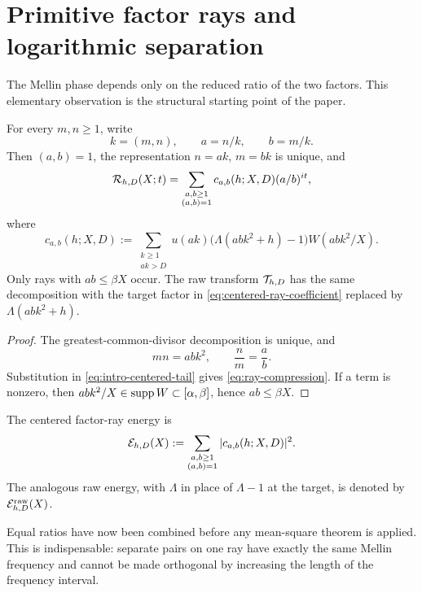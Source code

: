 \section{Primitive factor rays and logarithmic separation}
\label{sec:ray-geometry}

The Mellin phase depends only on the reduced ratio of the two factors.
This elementary observation is the structural starting point of the paper.

\begin{proposition}
\label{prop:ray-compression}
For every $m,n\geq1$, write
\[
 k=(m,n),\qquad a=n/k,\qquad b=m/k.
\]
Then $(a,b)=1$, the representation $n=ak$, $m=bk$ is unique, and
\begin{equation}
 \mathcal R_{h,D}(X;t)
 =\sum_{\substack{a,b\geq1\\(a,b)=1}}
 c_{a,b}(h;X,D)(a/b)^{it},
 \label{eq:ray-compression}
\end{equation}
where
\begin{equation}
 c_{a,b}(h;X,D)
 :=\sum_{\substack{k\geq1\\ak>D}}
 u(ak)\bigl(\Lambda(abk^2+h)-1\bigr)
 W(abk^2/X).
 \label{eq:centered-ray-coefficient}
\end{equation}
Only rays with $ab\leq\beta X$ occur.  The raw transform
$\mathcal T_{h,D}$ has the same decomposition with the target factor in
\eqref{eq:centered-ray-coefficient} replaced by $\Lambda(abk^2+h)$.
\end{proposition}

\begin{proof}
The greatest-common-divisor decomposition is unique, and
\[
 mn=abk^2,\qquad \frac{n}{m}=\frac{a}{b}.
\]
Substitution in \eqref{eq:intro-centered-tail} gives
\eqref{eq:ray-compression}.  If a term is nonzero, then
$abk^2/X\in\operatorname{supp} W\subset[\alpha,\beta]$, hence $ab\leq\beta X$.
\end{proof}

\begin{definition}
\label{def:ray-energy}
The centered factor-ray energy is
\begin{equation}
 \mathcal E_{h,D}(X)
 :=\sum_{\substack{a,b\geq1\\(a,b)=1}}
 |c_{a,b}(h;X,D)|^2.
 \label{eq:ray-energy}
\end{equation}
The analogous raw energy, with $\Lambda$ in place of $\Lambda-1$ at the
target, is denoted by $\mathcal E^{\mathrm{raw}}_{h,D}(X)$.
\end{definition}

Equal ratios have now been combined before any mean-square theorem is
applied.  This is indispensable: separate pairs on one ray have exactly
the same Mellin frequency and cannot be made orthogonal by increasing the
length of the frequency interval.


